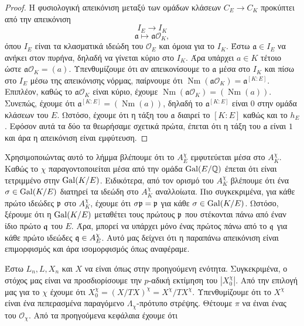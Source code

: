 \begin{proof}
    Η φυσιολογική απεικόνιση μεταξύ των ομάδων κλάσεων $C_E \longrightarrow C_K$ προκύπτει από την απεικόνιση
    $$I_E \longrightarrow I_K$$
    $$\mathfrak{a} \longmapsto \mathfrak{a}\mathcal{O}_K,$$ όπου $I_E$ είναι τα κλασματικά ιδεώδη του $\mathcal{O}_E$ και όμοια 
    για το $I_K$. Έστω $\mathfrak{a} \in I_E$ να ανήκει στον πυρήνα, δηλαδή να γίνεται κύριο στο $I_K$. Άρα υπάρχει $a \in K$ τέτοιο 
    ώστε $\mathfrak{a}\mathcal{O}_K = (a)$. Υπενθυμίζουμε ότι αν απεικονίσουμε το $\mathfrak{a}$ μέσα στο $I_K$ και πίσω στο $I_E$ 
    μέσω της απεικόνισης νόρμας, παίρνουμε ότι $\operatorname{Nm}(\mathfrak{a}\mathcal{O}_K) = \mathfrak{a}^{[K:E]}$. Επιπλέον, καθώς το $\mathfrak{a}\mathcal{O}_K$ είναι κύριο, έχουμε $\operatorname{Nm}(\mathfrak{a}\mathcal{O}_K) = (\operatorname{Nm}(a))$. Συνεπώς, 
    έχουμε ότι $\mathfrak{a}^{[K:E]} = (\operatorname{Nm}(a))$, δηλαδή το $\mathfrak{a}^{[K:E]}$ είναι $0$ στην ομάδα κλάσεων του $E$. Ωστόσο, έχουμε ότι η τάξη του $\mathfrak{a}$ διαιρεί το $[K:E]$ καθώς και το $h_E$. Εφόσον αυτά τα δύο τα θεωρήσαμε σχετικά πρώτα, έπεται ότι η τάξη του $\mathfrak{a}$ είναι $1$ και άρα η απεικόνιση είναι εμφύτευση.
\end{proof}

\noindent Χρησιμοποιώντας αυτό το λήμμα βλέπουμε ότι το $A^\chi_E$ εμφυτεύεται μέσα στο $A^\chi_K$. Καθώς το $\chi$ παραγοντοποιείται 
μέσα από την ομάδα $\operatorname{Gal}(E/\mathbb{Q})$ έπεται ότι είναι τετριμμένο στην $\operatorname{Gal}(K/E)$. Ειδικότερα, από τον ορισμό του $A^\chi_K$ βλέπουμε ότι ένα $\sigma \in \operatorname{Gal}(K/E)$ διατηρεί τα ιδεώδη στο $A^\chi_K$ αναλλοίωτα. Πιο συγκεκριμένα,
για κάθε πρώτο ιδεώδες $\mathfrak{p}$ στο $A^\chi_K$, έχουμε ότι $\sigma \mathfrak{p} = \mathfrak{p}$ για κάθε $\sigma \in\operatorname{Gal}(K/E)$. Ωστόσο, 
ξέρουμε ότι η $\operatorname{Gal}(K/E)$ μεταθέτει τους πρώτους $\mathfrak{p}$ που στέκονται πάνω από έναν ίδιο πρώτο $\mathfrak{q}$ του $E$. Άρα, μπορεί να υπάρχει μόνο ένας πρώτος πάνω από το $\mathfrak{q}$ για κάθε πρώτο ιδεώδες $\mathfrak{q} \in A^\chi_E$. Αυτό μας δείχνει ότι η παραπάνω απεικόνιση είναι επιμορφισμός και άρα ισομορφισμός όπως αναφέραμε.

Έστω $L_n,L,X_n$ και $X$ να είναι όπως στην προηγούμενη ενότητα. Συγκεκριμένα, ο στόχος μας είναι να προσδιορίσουμε την $p$-αδική εκτίμηση του $|X_0^\chi|$. Από την επιλογή μας για το $\chi$ έχουμε ότι 
$X^\chi_0 = (X/TX)^\chi = X^\chi /TX^\chi$. Υπενθυμίζουμε ότι το $X^\chi$ είναι ένα πεπερασμένα παραγόμενο $\Lambda_\chi$-πρότυπο στρέψης. Θέτουμε $\pi$ να έιναι ένας  του $\mathcal{O}_\chi$. Από τα προηγούμενα κεφάλαια έχουμε ότι 

